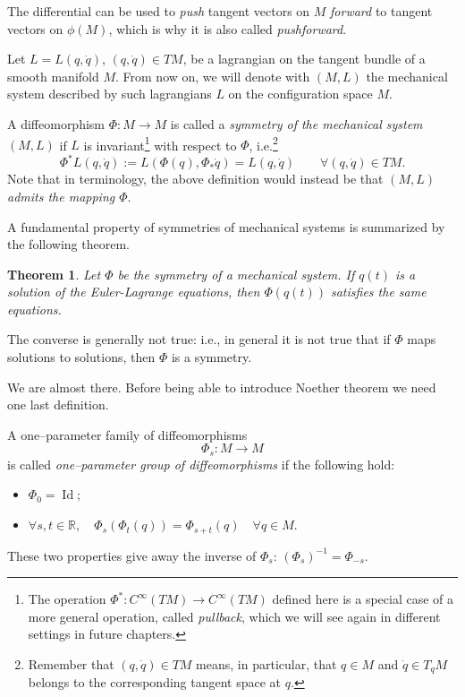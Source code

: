 \documentclass[english,fontsize=11pt,paper=b5]{scrbook}
\numberwithin{equation}{chapter}
\DeclareMathOperator{\Id}{Id}
\DeclareMathOperator{\Id}{Id}
\newtheorem{theorem}{Theorem}[chapter]
\theoremstyle{definition}
\begin{document}
    The differential can be used to \emph{push} tangent vectors on $M$ \emph{forward} to tangent vectors on $\phi(M)$, which is why it is also called \emph{pushforward}.

    \begin{tcolorbox}
      Let $L = L(q, \dot q)$, $(q, \dot q)\in TM$, be a lagrangian on the tangent bundle of a smooth manifold $M$. From now on, we will denote with $(M, L)$ the mechanical system described by such lagrangians $L$ on the configuration space $M$.
    \end{tcolorbox}

    A diffeomorphism $\Phi: M \to M$ is called a \emph{symmetry of the mechanical system $(M,L)$} if $L$ is invariant\footnote{The operation $\Phi^*:C^\infty(TM) \to C^\infty(TM)$ defined here is a special case of a more general operation, called \emph{pullback}, which we will see again in different settings in future chapters.} with respect to $\Phi$, i.e.\footnote{Remember that $(q,\dot q)\in TM$ means, in particular, that $q\in M$ and $\dot q \in T_q M$ belongs to the corresponding tangent space at $q$.}
    \begin{equation}\label{eq:symmetry}
      \Phi^* L (q,\dot q) := L\left(\Phi(q), \Phi_*\dot q\right) = L(q,\dot q) \qquad \forall (q,\dot q) \in TM.
    \end{equation}
    Note that in \cite[Chapter 4]{book:arnold} terminology, the above definition would instead be that \emph{$(M,L)$ admits the mapping $\Phi$}.

    A fundamental property of symmetries of mechanical systems is summarized by the following theorem.

    \begin{theorem}
      Let $\Phi$ be the symmetry of a mechanical system. If $q(t)$ is a solution of the Euler-Lagrange equations, then $\Phi(q(t))$ satisfies the same equations.
    \end{theorem}

    The converse is generally not true: i.e., in general it is not true that if $\Phi$ maps solutions to solutions, then $\Phi$ is a symmetry.

    We are almost there.
    Before being able to introduce Noether theorem we need one last definition.

    A one--parameter family of diffeomorphisms
    \begin{equation}
      \Phi_s : M \to M
    \end{equation}
    is called \emph{one--parameter group of diffeomorphisms} if the following hold:
    \begin{itemize}
      \item $\Phi_0 = \Id$;
      \item $\forall s, t \in \mathbb{R}, \quad \Phi_s(\Phi_t(q)) = \Phi_{s+t}(q)\quad \forall q\in M$.
    \end{itemize}
    These two properties give away the inverse of $\Phi_s$: $(\Phi_s)^{-1} = \Phi_{-s}$.
\end{document}

